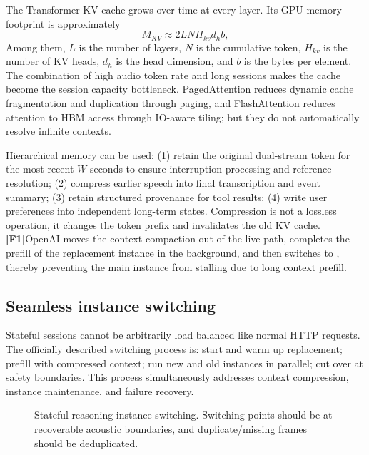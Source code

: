 \documentclass[UTF8,fontset=none,a4paper,10pt]{ctexart}
\newcommand{\FOne}{\textcolor{official}{\textbf{[F1]}}}
\begin{document}
The Transformer KV cache grows over time at every layer. Its GPU-memory footprint is approximately
\begin{equation}
M_{KV}\approx 2LNH_{kv}d_hb,
\end{equation}
Among them, $L$ is the number of layers, $N$ is the cumulative token, $H_{kv}$ is the number of KV heads, $d_h$ is the head dimension, and $b$ is the bytes per element. The combination of high audio token rate and long sessions makes the cache become the session capacity bottleneck. PagedAttention reduces dynamic cache fragmentation and duplication through paging, and FlashAttention reduces attention to HBM access \cite{kwon2023pagedattention,dao2022flashattention} through IO-aware tiling; but they do not automatically resolve infinite contexts.

Hierarchical memory can be used: (1) retain the original dual-stream token for the most recent $W$ seconds to ensure interruption processing and reference resolution; (2) compress earlier speech into final transcription and event summary; (3) retain structured provenance for tool results; (4) write user preferences into independent long-term states. Compression is not a lossless operation, it changes the token prefix and invalidates the old KV cache. \FOne OpenAI moves the context compaction out of the live path, completes the prefill of the replacement instance in the background, and then switches to \cite{openai2026continuous}, thereby preventing the main instance from stalling due to long context prefill.

\subsection{Seamless instance switching}

Stateful sessions cannot be arbitrarily load balanced like normal HTTP requests. The officially described switching process is: start and warm up replacement; prefill with compressed context; run new and old instances in parallel; cut over at safety boundaries. This process simultaneously addresses context compression, instance maintenance, and failure recovery.

\begin{figure}[H]
\centering
{}
\caption{Stateful reasoning instance switching. Switching points should be at recoverable acoustic boundaries, and duplicate/missing frames should be deduplicated.}
\end{figure}
\end{document}
